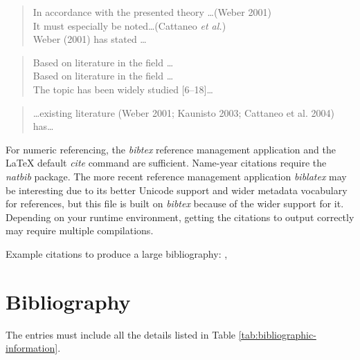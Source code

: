 \documentclass[twoside,draftfooter]{tutthesis} %
\begin{document}
  \begin{quotation}
  In accordance with the presented theory \ldots (Weber 2001)\\
  It must especially be noted\ldots (Cattaneo \emph{et al.})\\
  Weber (2001) has stated \ldots
  \end{quotation}
    
  \begin{quotation}
  Based on literature in the field \cite{Weber2001,Cattaneo2004,Kaunisto2003}\ldots\\
  Based on literature in the field \cite{Weber2001}\cite{Cattaneo2004}\cite{Kaunisto2003}\ldots\\
  The topic has been widely studied [6--18]\ldots %
  \end{quotation}
    
  \begin{quotation}
  \ldots existing literature (Weber 2001; Kaunisto 2003; Cattaneo et al. 2004) has\ldots
  \end{quotation}
\fi

For numeric referencing, the \emph{bibtex} reference management application and the LaTeX default \emph{cite} command are sufficient.
Name-year citations require the \emph{natbib} package.
The more recent reference management application \emph{biblatex} may be interesting due to its better Unicode support and wider metadata vocabulary for references, but this file is built on \emph{bibtex} because of the wider support for it.
Depending on your runtime environment, getting the citations to output correctly may require multiple compilations.

Example citations to produce a large bibliography: \citep{Weber2001} \citep{Cattaneo2004} \citep{Kaunisto2003} \citep{Li2004} \citep{Ho-Ching2003} \citep{Puhakka2004} \citep{Nissinen2011en} \citep{Ohlstrom2005} \citep{OMAP4430} \citep{InjectionMolding2005} \citep{Raakakk2002} \citep{Intel2013} \citep{Davies2004} \citep{SFSISO1000A1} \citep{Keskinen2005en} \citep{Sahkoturvallisuuslaki1996} \citep{Pan2013} \citep{Tty2005en} \citep{ConstInorgComp2005}, \citep{Radionuklidit2003en} \citep{Kalkkihiekkatiilet2004} \citep{Miettinen2005en}


\section{Bibliography}

The entries must include all the details listed in Table \ref{tab:bibliographic-information}.
\end{document}
